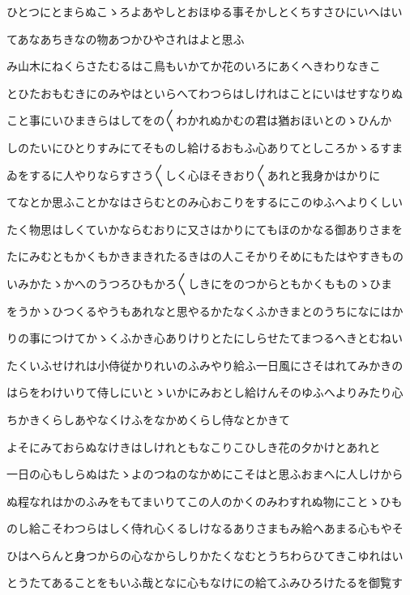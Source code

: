 \documentclass[a4paper,11pt,landscape]{ltjtarticle}
\begin{document}
ひとつにとまらぬこゝろよあやしとおほゆる事そかしとくちすさひにいへはい
\par\medskip
てあなあちきなの物あつかひやされはよと思ふ
\par\medskip
み山木にねくらさたむるはこ鳥もいかてか花のいろにあくへきわりなきこ
\par\medskip
とひたおもむきにのみやはといらへてわつらはしけれはことにいはせすなりぬ
\par\medskip
こと事にいひまきらはしてをの〱わかれぬかむの君は猶おほいとのゝひんか
\par\medskip
しのたいにひとりすみにてそものし給けるおもふ心ありてとしころかゝるすま
\par\medskip
ゐをするに人やりならすさう〱しく心ほそきおり〱あれと我身かはかりに
\par\medskip
てなとか思ふことかなはさらむとのみ心おこりをするにこのゆふへよりくしい
\par\medskip
たく物思はしくていかならむおりに又さはかりにてもほのかなる御ありさまを
\par\medskip
たにみむともかくもかきまきれたるきはの人こそかりそめにもたはやすきもの
\par\medskip
いみかたゝかへのうつろひもかろ〱しきにをのつからともかくもものゝひま
\par\medskip
をうかゝひつくるやうもあれなと思やるかたなくふかきまとのうちになにはか
\par\medskip
りの事につけてかゝくふかき心ありけりとたにしらせたてまつるへきとむねい
\par\medskip
たくいふせけれは小侍従かりれいのふみやり給ふ一日風にさそはれてみかきの
\par\medskip
はらをわけいりて侍しにいとゝいかにみおとし給けんそのゆふへよりみたり心
\par\medskip
ちかきくらしあやなくけふをなかめくらし侍なとかきて
\par\medskip
よそにみておらぬなけきはしけれともなこりこひしき花の夕かけとあれと
\par\medskip
一日の心もしらぬはたゝよのつねのなかめにこそはと思ふおまへに人しけから
\par\medskip
ぬ程なれはかのふみをもてまいりてこの人のかくのみわすれぬ物にことゝひも
\par\medskip
のし給こそわつらはしく侍れ心くるしけなるありさまもみ給へあまる心もやそ
\par\medskip
ひはへらんと身つからの心なからしりかたくなむとうちわらひてきこゆれはい
\par\medskip
とうたてあることをもいふ哉となに心もなけにの給てふみひろけたるを御覧す
\end{document}
